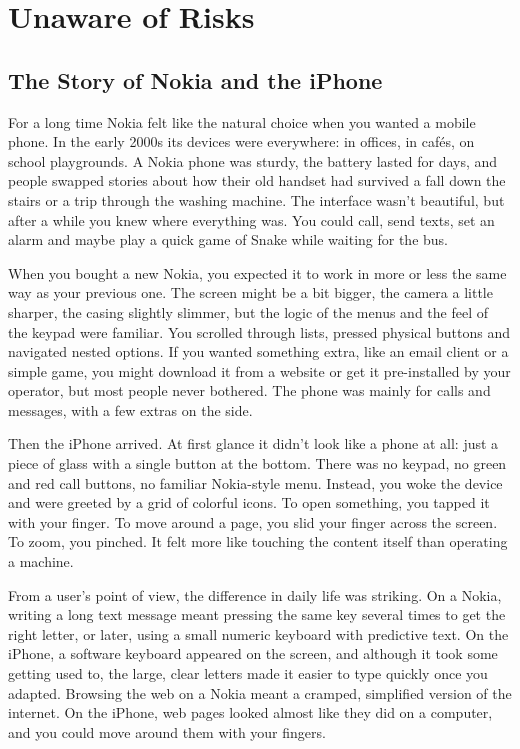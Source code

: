 \chapter{Unaware of Risks}

\section{The Story of Nokia and the iPhone}

For a long time Nokia felt like the natural choice when you wanted a mobile phone. In the early 2000s its devices were everywhere: in offices, in cafés, on school playgrounds. A Nokia phone was sturdy, the battery lasted for days, and people swapped stories about how their old handset had survived a fall down the stairs or a trip through the washing machine. The interface wasn't beautiful, but after a while you knew where everything was. You could call, send texts, set an alarm and maybe play a quick game of Snake while waiting for the bus.

When you bought a new Nokia, you expected it to work in more or less the same way as your previous one. The screen might be a bit bigger, the camera a little sharper, the casing slightly slimmer, but the logic of the menus and the feel of the keypad were familiar. You scrolled through lists, pressed physical buttons and navigated nested options. If you wanted something extra, like an email client or a simple game, you might download it from a website or get it pre-installed by your operator, but most people never bothered. The phone was mainly for calls and messages, with a few extras on the side.

Then the iPhone arrived. At first glance it didn't look like a phone at all: just a piece of glass with a single button at the bottom. There was no keypad, no green and red call buttons, no familiar Nokia-style menu. Instead, you woke the device and were greeted by a grid of colorful icons. To open something, you tapped it with your finger. To move around a page, you slid your finger across the screen. To zoom, you pinched. It felt more like touching the content itself than operating a machine.

From a user’s point of view, the difference in daily life was striking. On a Nokia, writing a long text message meant pressing the same key several times to get the right letter, or later, using a small numeric keyboard with predictive text. On the iPhone, a software keyboard appeared on the screen, and although it took some getting used to, the large, clear letters made it easier to type quickly once you adapted. Browsing the web on a Nokia meant a cramped, simplified version of the internet. On the iPhone, web pages looked almost like they did on a computer, and you could move around them with your fingers.

